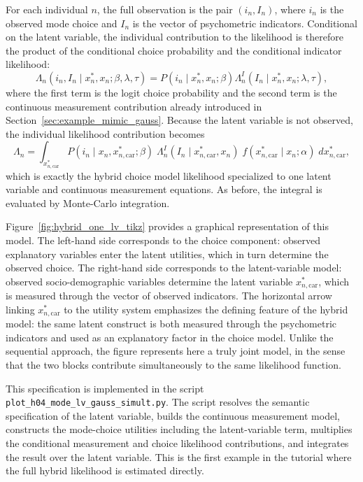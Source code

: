 \documentclass[12pt,a4paper]{article}
\let\OrigUnderscore\_
\def\_{\OrigUnderscore\penalty0\hspace{0pt}}%
\begin{document}
For each individual \(n\), the full observation is the pair
\((i_n,I_n)\), where \(i_n\) is the observed mode choice and \(I_n\)
is the vector of psychometric indicators. Conditional on the latent
variable, the individual contribution to the likelihood is therefore
the product of the conditional choice probability and the conditional
indicator likelihood:
\begin{equation}
  \label{eq:example4_conditional_likelihood}
\Lambda_n(i_n,I_n\mid x_n^*,x_n;
\beta,\lambda,\tau)
=
P(i_n\mid x_n^*,x_n;\beta)
\Lambda_n^{I}(I_n\mid x_n^*,x_n;\lambda,\tau),
\end{equation}
where the first term is the logit choice probability and the second
term is the continuous measurement contribution already introduced in
Section~\ref{sec:example_mimic_gauss}. Because the latent variable is
not observed, the individual likelihood contribution becomes
\begin{equation}
  \label{eq:example4_likelihood}
  \Lambda_n = \int_{x^*_{n,\mathrm{car}}} P(i_n \mid
  x_n,x^*_{n,\mathrm{car}};\beta)\; \Lambda_n^I(I_n \mid
  x^*_{n,\mathrm{car}},x_n)\; f(x^*_{n,\mathrm{car}} \mid x_n;\alpha)\;
  dx^*_{n,\mathrm{car}},
\end{equation}
which is exactly the hybrid choice model likelihood specialized to one
latent variable and continuous measurement equations. As before, the
integral is evaluated by Monte-Carlo integration.

Figure~\ref{fig:hybrid_one_lv_tikz} provides a graphical
representation of this model. The left-hand side corresponds to the
choice component: observed explanatory variables enter the latent
utilities, which in turn determine the observed choice. The right-hand
side corresponds to the latent-variable model: observed
socio-demographic variables determine the latent variable
\(x^*_{n,\mathrm{car}}\), which is measured through the vector of
observed indicators. The horizontal arrow linking
\(x^*_{n,\mathrm{car}}\) to the utility system emphasizes the defining
feature of the hybrid model: the same latent construct is both
measured through the psychometric indicators and used as an
explanatory factor in the choice model. Unlike the sequential
approach, the figure represents here a truly joint model, in the sense
that the two blocks contribute simultaneously to the same likelihood
function.

This specification is implemented in the script
\texttt{plot\_h04\_mode\_lv\_gauss\_simult.py}. The script resolves
the semantic specification of the latent variable, builds the
continuous measurement model, constructs the mode-choice utilities
including the latent-variable term, multiplies the conditional
measurement and choice likelihood contributions, and integrates the
result over the latent variable. This is the first example in the
tutorial where the full hybrid likelihood is estimated directly.
\end{document}
